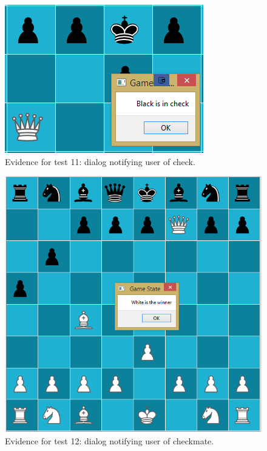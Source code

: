 \begin{figure}[H]
	\centering
	\includegraphics{images/screenshots/test-11}
	\caption{Evidence for test 11: dialog notifying user of check.}
	\label{test-11}
\end{figure}
\begin{figure}[H]
	\centering
	\includegraphics[width=1.0\textwidth]{images/screenshots/test-12}
	\caption{Evidence for test 12: dialog notifying user of checkmate.}
	\label{test-12}
\end{figure}
